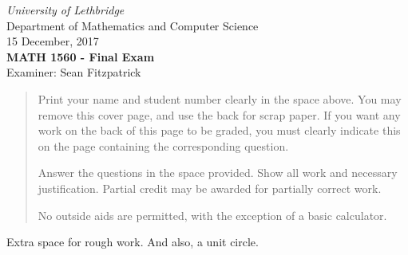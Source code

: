 \documentclass[12pt]{article}
\newcommand{\skipline}{\vspace{12pt}}
\begin{document}
\author{Instructor: Sean Fitzpatrick}
\thispagestyle{plain}
\begin{center}
\emph{University of Lethbridge}\\
Department of Mathematics and Computer Science\\
15 December, 2017\\
{\bf MATH 1560 - Final Exam}\\
Examiner: Sean Fitzpatrick
\end{center}



\vspace{0.1in}

\vspace*{\fill}

\begin{quote}
Print your name and student number clearly in the space above. You may remove this cover page, and use the back for scrap paper. If you want any work on the back of this page to be graded, you must clearly indicate this on the page containing the corresponding question.

\medskip

Answer the questions in the space provided. Show all work and necessary justification. Partial credit may be awarded for partially correct work.
 
\medskip

No outside aids are permitted, with the exception of a basic calculator. 
\end{quote}



\newpage

Extra space for rough work. And also, a unit circle.

\vspace*{\fill}
\end{document}
